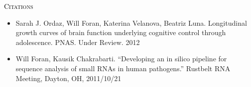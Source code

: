 \begin{minipage}{\firstWidth}
\large \textcolor{Black}{\textsc{Citations}}
\end{minipage}
\begin{minipage}{\secondWidth}
\begin{itemize}
   \item  Sarah J. Ordaz, Will Foran, Katerina Velanova, Beatriz Luna. Longitudinal growth curves of brain function underlying cognitive control through adolescence. PNAS. Under Review. 2012
   \item Will Foran, Kausik Chakrabarti. ``Developing an in silico pipeline for sequence analysis of small RNAs in human pathogens.'' Rustbelt RNA Meeting, Dayton, OH, 2011/10/21
\end{itemize}
\end{minipage}

